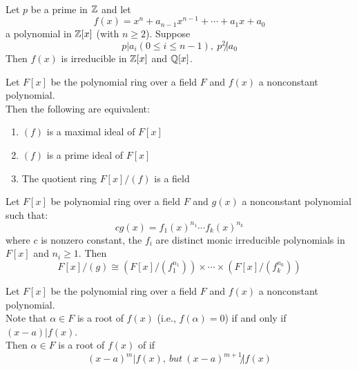 \begin{proposition}
\\
Let $p$ be a prime in $\mathbb{Z}$ and let
\begin{equation}
f(x) = x^n + a_{n-1} x^{n-1} + \cdots + a_1 x + a_0 \nonumber
\end{equation}
a polynomial in $\mathbb{Z} [x]$ (with $n \geq 2$). Suppose
\begin{equation}
p|a_i (0 \leq i \leq n-1), \ p^2 \not| a_0 \nonumber
\end{equation}
Then $f(x)$ is irreducible in $\mathbb{Z} [x]$ and $\mathbb{Q} [x]$.
\end{proposition}

\begin{proposition}
Let $F[x]$ be the polynomial ring over a field $F$ and $f(x)$ a nonconstant polynomial.\\
Then the following are equivalent:
\begin{enumerate}[label=(\roman*)]
\item $(f)$ is a maximal ideal of $F[x]$
\item $(f)$ is a prime ideal of $F[x]$
\item The quotient ring $F[x]/(f)$ is a field
\end{enumerate}
\end{proposition}

\begin{proposition}
Let $F[x]$ be polynomial ring over a field $F$ and $g(x)$ a nonconstant polynomial such that:
\begin{equation}
cg(x) = f_1 (x)^{n_1} \cdots f_k (x)^{n_k} \nonumber
\end{equation}
where $c$ is nonzero constant, the $f_i$ are distinct monic irreducible polynomials in $F[x]$ and $n_i \geq 1$. Then
\begin{equation}
F[x]/(g) \cong (F[x]/(f_1^{n_1})) \times \cdots \times (F[x]/(f_k^{n_k})) \nonumber
\end{equation}
\end{proposition}

\begin{definition}
Let $F[x]$ be the polynomial ring over a field $F$ and $f(x)$ a nonconstant polynomial.\\
Note that $\alpha \in F$ is a root of $f(x)$ (i.e., $f(\alpha) = 0$) if and only if $(x-a) | f(x)$.\\
Then $\alpha \in F$ is a root of $f(x)$ of  if
\begin{equation}
(x-a)^m | f(x), \ but \ (x-a)^{m+1} \not| f(x) \nonumber
\end{equation}
\end{definition}


